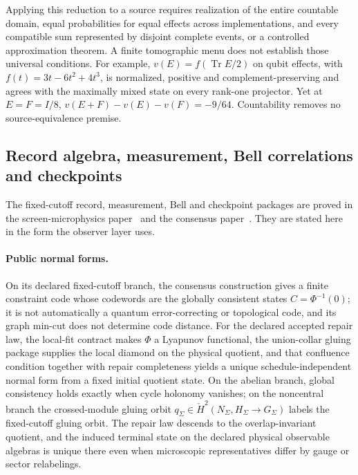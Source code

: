 \documentclass[11pt]{article}
\begin{document}
Applying this reduction to a source requires realization of the entire
countable domain, equal probabilities for equal effects across implementations,
and every compatible sum represented by disjoint complete events, or a controlled
approximation theorem. A finite tomographic menu does not establish those
universal conditions. For example,
$v(E)=f(\operatorname{Tr}E/2)$ on qubit effects, with
$f(t)=3t-6t^2+4t^3$, is normalized, positive and complement-preserving and agrees
with the maximally mixed state on every rank-one projector. Yet at $E=F=I/8$,
$v(E+F)-v(E)-v(F)=-9/64$. Countability removes no source-equivalence premise.

\subsection{Record algebra, measurement, Bell correlations and checkpoints}
\label{sec:record-measurement}

The fixed-cutoff record, measurement, Bell and checkpoint packages are proved
in the screen-microphysics paper~\cite{ophmicrophysics} and the consensus
paper~\cite{ophconsensus}. They are stated here in the form the observer layer
uses.

\paragraph{Public normal forms.}
On its declared fixed-cutoff branch, the consensus construction gives a
finite constraint code whose codewords are the globally consistent states
\(C=\Phi^{-1}(0)\); it is not automatically a quantum error-correcting or
topological code, and its graph min-cut does not determine code distance. For
the declared accepted repair law, the local-fit contract makes \(\Phi\) a
Lyapunov functional, the union-collar gluing package supplies the local
diamond on the physical quotient, and that confluence condition together with
repair completeness yields a unique schedule-independent normal form from a
fixed initial quotient state. On the abelian branch, global consistency holds
exactly when cycle holonomy vanishes; on the noncentral branch the
crossed-module gluing orbit
\(q_\Sigma\in\check H^2(N_\Sigma,H_\Sigma\to G_\Sigma)\) labels the fixed-cutoff
gluing orbit. The repair law descends to the overlap-invariant quotient, and
the induced terminal state on the declared physical observable algebras is
unique there even when microscopic representatives differ by gauge or sector
relabelings.
\end{document}

